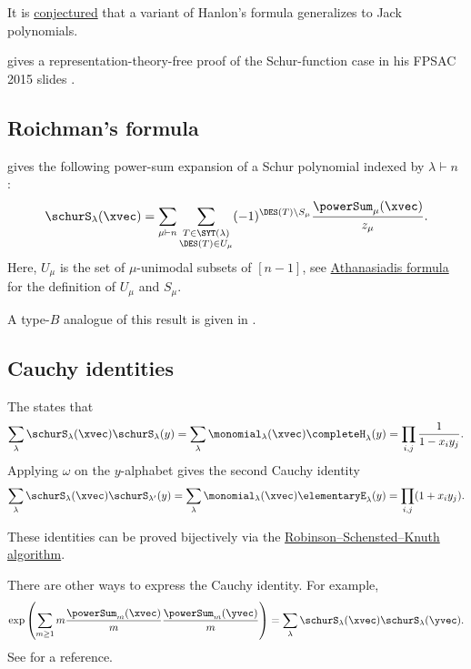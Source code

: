 It is \hyperref[jackCharacterConjecture]{conjectured} that a
variant of Hanlon's formula generalizes to Jack polynomials.

 gives a representation-theory-free proof of the
Schur-function case in his FPSAC 2015 slides \cite{Feray2015FPSACSlides}.


\subsection[schurRoichmanFormula]{Roichman's formula}

 gives the following power-sum expansion of a Schur
polynomial indexed by $\lambda \vdash n$ \cite{Roichman1997}:
\[
 \schurS_\lambda(\xvec) = \sum_{\mu \vdash n}
 \sum_{\substack{ T \in \SYT(\lambda) \\  \DES(T) \in U_\mu }}
 (-1)^{\DES(T) \setminus S_\mu} \frac{\powerSum_\mu(\xvec)}{z_\mu}.
\]
Here, $U_\mu$ is the set of $\mu$-unimodal subsets of $[n-1]$, see \hyperref[gesselPowerSum]{Athanasiadis formula}
for the definition of $U_\mu$ and $S_\mu$.

A type-$B$ analogue of this result is given in \cite{AdinEtAl2017}.


\subsection[schurCauchyFormula]{Cauchy identities}

The \label{cauchyIdentity} states that
\begin{equation*}
 \sum_\lambda \schurS_\lambda(\xvec) \schurS_{\lambda}(y)
 =
 \sum_\lambda \monomial_\lambda(\xvec) \completeH_{\lambda}(y)
 =
 \prod_{i,j} \frac{1}{1-x_i y_j}.
\end{equation*}
Applying \hyperref[standardInvolution]{$\omega$} on the $y$-alphabet gives
the second Cauchy identity
\begin{equation*}
 \sum_\lambda \schurS_\lambda(\xvec) \schurS_{\lambda'}(y)
 =
 \sum_\lambda \monomial_\lambda(\xvec) \elementaryE_{\lambda}(y)
 =
 \prod_{i,j} (1+x_i y_j).
\end{equation*}

These identities can be proved bijectively via the
\hyperref[rsk]{Robinson--Schensted--Knuth algorithm}.


There are other ways to express the Cauchy identity.
For example,
\[
  \exp\left(  \sum_{m\geq 1} m \frac{\powerSum_m(\xvec)}{m} \frac{\powerSum_m(\yvec)}{m} \right)
  = \sum_{\lambda} \schurS_\lambda(\xvec)\schurS_\lambda(\yvec).
\]
See \cite[p.~386]{StanleyEC2} for a reference.

